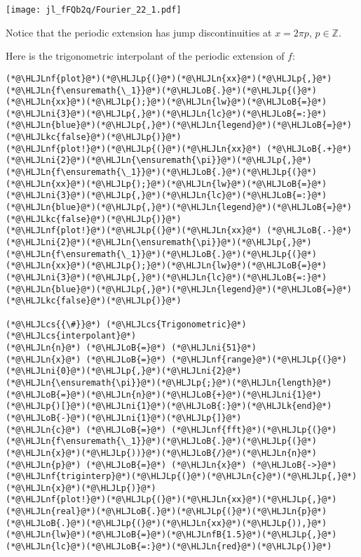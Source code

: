 \documentclass[12pt,a4paper]{article}
\newcommand{\HLJLk}[1]{\textcolor[RGB]{148,91,176}{\textbf{#1}}}
\newcommand{\HLJLkc}[1]{\textcolor[RGB]{59,151,46}{\textit{#1}}}
\newcommand{\HLJLn}[1]{#1}
\newcommand{\HLJLnf}[1]{\textcolor[RGB]{66,102,213}{#1}}
\newcommand{\HLJLnfB}[1]{\textcolor[RGB]{59,151,46}{#1}}
\newcommand{\HLJLni}[1]{\textcolor[RGB]{59,151,46}{#1}}
\newcommand{\HLJLoB}[1]{\textcolor[RGB]{102,102,102}{\textbf{#1}}}
\newcommand{\HLJLp}[1]{#1}
\newcommand{\HLJLcs}[1]{\textcolor[RGB]{153,153,119}{\textit{#1}}}
\begin{document}
\texttt{[image: jl\_fFQb2q/Fourier\_22\_1.pdf]}

Notice that the periodic extension has jump discontinuities at $x = 2\pi p$, $p \in \mathbb{Z}$.

Here is the trigonometric interpolant of the periodic extension of $f$:


\begin{lstlisting}
(*@\HLJLnf{plot}@*)(*@\HLJLp{(}@*)(*@\HLJLn{xx}@*)(*@\HLJLp{,}@*)(*@\HLJLn{f\ensuremath{\_1}}@*)(*@\HLJLoB{.}@*)(*@\HLJLp{(}@*)(*@\HLJLn{xx}@*)(*@\HLJLp{);}@*)(*@\HLJLn{lw}@*)(*@\HLJLoB{=}@*)(*@\HLJLni{3}@*)(*@\HLJLp{,}@*)(*@\HLJLn{lc}@*)(*@\HLJLoB{=:}@*)(*@\HLJLn{blue}@*)(*@\HLJLp{,}@*)(*@\HLJLn{legend}@*)(*@\HLJLoB{=}@*)(*@\HLJLkc{false}@*)(*@\HLJLp{)}@*)
(*@\HLJLnf{plot!}@*)(*@\HLJLp{(}@*)(*@\HLJLn{xx}@*) (*@\HLJLoB{.+}@*) (*@\HLJLni{2}@*)(*@\HLJLn{\ensuremath{\pi}}@*)(*@\HLJLp{,}@*)(*@\HLJLn{f\ensuremath{\_1}}@*)(*@\HLJLoB{.}@*)(*@\HLJLp{(}@*)(*@\HLJLn{xx}@*)(*@\HLJLp{);}@*)(*@\HLJLn{lw}@*)(*@\HLJLoB{=}@*)(*@\HLJLni{3}@*)(*@\HLJLp{,}@*)(*@\HLJLn{lc}@*)(*@\HLJLoB{=:}@*)(*@\HLJLn{blue}@*)(*@\HLJLp{,}@*)(*@\HLJLn{legend}@*)(*@\HLJLoB{=}@*)(*@\HLJLkc{false}@*)(*@\HLJLp{)}@*)
(*@\HLJLnf{plot!}@*)(*@\HLJLp{(}@*)(*@\HLJLn{xx}@*) (*@\HLJLoB{.-}@*) (*@\HLJLni{2}@*)(*@\HLJLn{\ensuremath{\pi}}@*)(*@\HLJLp{,}@*)(*@\HLJLn{f\ensuremath{\_1}}@*)(*@\HLJLoB{.}@*)(*@\HLJLp{(}@*)(*@\HLJLn{xx}@*)(*@\HLJLp{);}@*)(*@\HLJLn{lw}@*)(*@\HLJLoB{=}@*)(*@\HLJLni{3}@*)(*@\HLJLp{,}@*)(*@\HLJLn{lc}@*)(*@\HLJLoB{=:}@*)(*@\HLJLn{blue}@*)(*@\HLJLp{,}@*)(*@\HLJLn{legend}@*)(*@\HLJLoB{=}@*)(*@\HLJLkc{false}@*)(*@\HLJLp{)}@*)

(*@\HLJLcs{{\#}}@*) (*@\HLJLcs{Trigonometric}@*) (*@\HLJLcs{interpolant}@*)
(*@\HLJLn{n}@*) (*@\HLJLoB{=}@*) (*@\HLJLni{51}@*)
(*@\HLJLn{x}@*) (*@\HLJLoB{=}@*) (*@\HLJLnf{range}@*)(*@\HLJLp{(}@*)(*@\HLJLni{0}@*)(*@\HLJLp{,}@*)(*@\HLJLni{2}@*)(*@\HLJLn{\ensuremath{\pi}}@*)(*@\HLJLp{;}@*)(*@\HLJLn{length}@*)(*@\HLJLoB{=}@*)(*@\HLJLn{n}@*)(*@\HLJLoB{+}@*)(*@\HLJLni{1}@*)(*@\HLJLp{)[}@*)(*@\HLJLni{1}@*)(*@\HLJLoB{:}@*)(*@\HLJLk{end}@*)(*@\HLJLoB{-}@*)(*@\HLJLni{1}@*)(*@\HLJLp{]}@*)
(*@\HLJLn{c}@*) (*@\HLJLoB{=}@*) (*@\HLJLnf{fft}@*)(*@\HLJLp{(}@*)(*@\HLJLn{f\ensuremath{\_1}}@*)(*@\HLJLoB{.}@*)(*@\HLJLp{(}@*)(*@\HLJLn{x}@*)(*@\HLJLp{))}@*)(*@\HLJLoB{/}@*)(*@\HLJLn{n}@*)
(*@\HLJLn{p}@*) (*@\HLJLoB{=}@*) (*@\HLJLn{x}@*) (*@\HLJLoB{->}@*) (*@\HLJLnf{triginterp}@*)(*@\HLJLp{(}@*)(*@\HLJLn{c}@*)(*@\HLJLp{,}@*) (*@\HLJLn{x}@*)(*@\HLJLp{)}@*)
(*@\HLJLnf{plot!}@*)(*@\HLJLp{(}@*)(*@\HLJLn{xx}@*)(*@\HLJLp{,}@*)(*@\HLJLn{real}@*)(*@\HLJLoB{.}@*)(*@\HLJLp{(}@*)(*@\HLJLn{p}@*)(*@\HLJLoB{.}@*)(*@\HLJLp{(}@*)(*@\HLJLn{xx}@*)(*@\HLJLp{)),}@*)(*@\HLJLn{lw}@*)(*@\HLJLoB{=}@*)(*@\HLJLnfB{1.5}@*)(*@\HLJLp{,}@*)(*@\HLJLn{lc}@*)(*@\HLJLoB{=:}@*)(*@\HLJLn{red}@*)(*@\HLJLp{)}@*)
\end{lstlisting}
\end{document}
